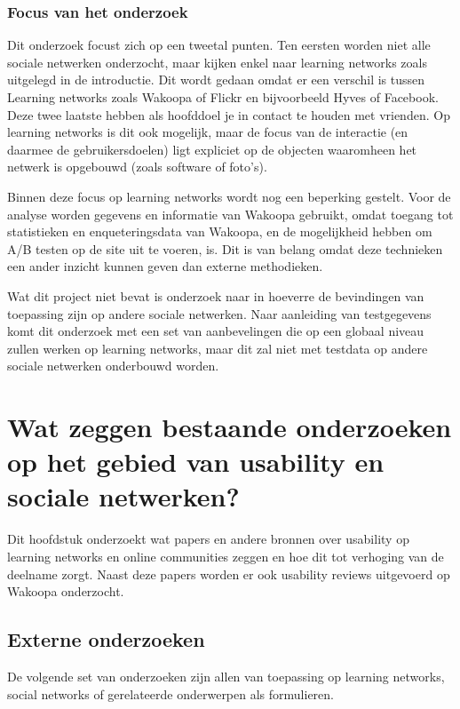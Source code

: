 \documentclass[a4paper, 10pt, pdftex]{report}
\begin{document}
  \subsection*{Focus van het onderzoek}
    Dit onderzoek focust zich op een tweetal punten. Ten eersten worden niet alle sociale netwerken onderzocht, maar kijken enkel naar learning networks zoals uitgelegd in de introductie. Dit wordt gedaan omdat er een verschil is tussen Learning networks zoals Wakoopa of Flickr en bijvoorbeeld Hyves of Facebook. Deze twee laatste hebben als hoofddoel je in contact te houden met vrienden. Op learning networks is dit ook mogelijk, maar de focus van de interactie (en daarmee de gebruikersdoelen) ligt expliciet op de objecten waaromheen het netwerk is opgebouwd (zoals software of foto's).

    Binnen deze focus op learning networks wordt nog een beperking gestelt. Voor de analyse worden gegevens en informatie van Wakoopa gebruikt, omdat toegang tot statistieken en enqueteringsdata van Wakoopa, en de mogelijkheid hebben om A/B testen op de site uit te voeren, is. Dit is van belang omdat deze technieken een ander inzicht kunnen geven dan externe methodieken.

    Wat dit project niet bevat is onderzoek naar in hoeverre de bevindingen van toepassing zijn op andere sociale netwerken. Naar aanleiding van testgegevens komt dit onderzoek met een set van aanbevelingen die op een globaal niveau zullen werken op learning networks, maar dit zal niet met testdata op andere sociale netwerken onderbouwd worden.

  \newpage
  \chapter{Wat zeggen bestaande onderzoeken op het gebied van usability en sociale netwerken?}
    \label{researchchapter}
    \newpage

    Dit hoofdstuk onderzoekt wat papers en andere bronnen over usability op learning networks en online communities zeggen en hoe dit tot verhoging van de deelname zorgt. Naast deze papers worden er ook usability reviews uitgevoerd op Wakoopa onderzocht.

    \section{Externe onderzoeken}
      De volgende set van onderzoeken zijn allen van toepassing op learning networks, social networks of gerelateerde onderwerpen als formulieren.
\end{document}
